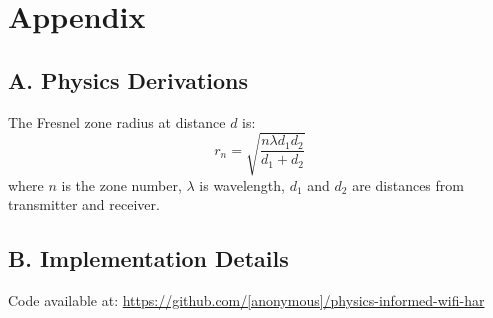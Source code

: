 \documentclass[10pt,conference]{IEEEtran}
\begin{document}
\section*{Appendix}

\subsection*{A. Physics Derivations}

The Fresnel zone radius at distance $d$ is:
\begin{equation}
    r_n = \sqrt{\frac{n\lambda d_1 d_2}{d_1 + d_2}}
\end{equation}
where $n$ is the zone number, $\lambda$ is wavelength, $d_1$ and $d_2$ are distances from transmitter and receiver.

\subsection*{B. Implementation Details}

Code available at: \url{https://github.com/[anonymous]/physics-informed-wifi-har}
\end{document}
